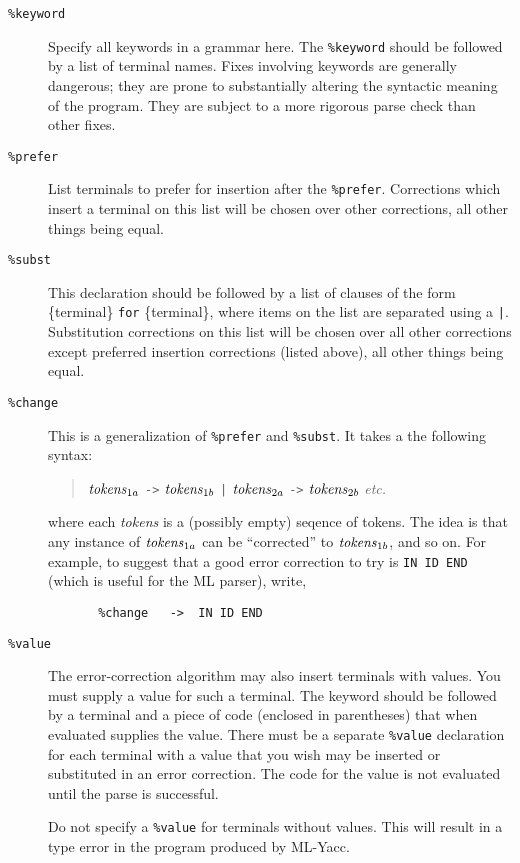 \begin{description}
\item[{\tt \%keyword}]
    Specify all keywords in a grammar here.  The {\tt \%keyword}
    should be followed by a list
    of terminal names.   Fixes involving keywords are generally dangerous;
    they are prone to substantially altering the syntactic meaning
    of the program.  They are subject to a more rigorous parse check than
    other fixes.

\item[{\tt \%prefer}]
     List terminals to prefer for insertion after the {\tt \%prefer}.
Corrections which insert a terminal on this list will be chosen over
other corrections, all other things being equal.
\item[{\tt \%subst}]
        This declaration should be followed by a list of clauses of the
     form \{terminal\} {\tt for} \{terminal\}, where items on the list are
     separated using a {\tt |}.  Substitution corrections on this list
will be chosen over all other corrections except preferred insertion
corrections (listed above), all other things being equal.
\item[{\tt \%change}]
    This is a generalization of {\tt \%prefer}  and {\tt \%subst}.
It takes a the following syntax:
\begin{quote}
${\it tokens}_{1a}$ \verb|->| ${\it tokens}_{1b}$ \verb+|+ ${\it tokens}_{2a}$ \verb|->| ${\it tokens}_{2b}$ {\it etc.}
\end{quote}
where each {\it tokens} is a (possibly empty) seqence of tokens.  The
idea is that any instance of ${\it tokens}_{1a}$ can be ``corrected'' to
${\it tokens}_{1b}$, and so on.  For example, to suggest that a good
error correction to try is \verb|IN ID END| (which is useful for the
ML parser), write,
\begin{verbatim}
       %change   ->  IN ID END
\end{verbatim}
\item[{\tt \%value}]
        The error-correction algorithm may also insert terminals with values.
     You must supply a value for such a terminal. The keyword
     should be followed by a terminal and a piece of
     code (enclosed in parentheses) that when evaluated supplies the value. 
     There must be a separate {\tt \%value} declaration for each terminal with
     a value that you wish may be inserted or substituted in an error correction.
     The code for the value is not evaluated until the parse is
     successful.

         Do not specify a {\tt \%value} for terminals without
     values. This will result in a type error in the program produced by
     ML-Yacc.
\end{description}

